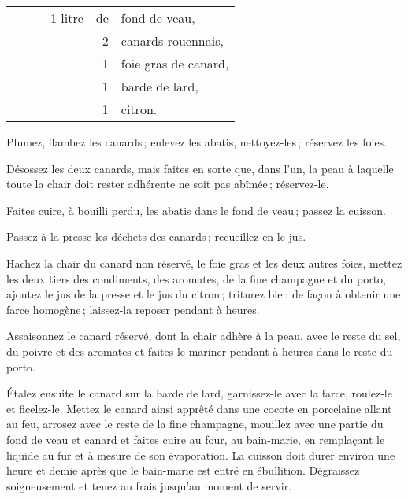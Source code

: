 \begin{longtable}{rrrrrp{18em}}
  & \hspace{2em} &     & 1 litre & de & fond de veau,                                                     \\
  & \hspace{2em} &     &         &  2 & canards rouennais,                                                \\
  & \hspace{2em} &     &         &  1 & foie gras de canard,                                              \\
  & \hspace{2em} &     &         &  1 & barde de lard,                                                    \\
  & \hspace{2em} &     &         &  1 & citron.                                                           \\
\end{longtable}
\normalsize

Plumez, flambez les canards ; enlevez les abatis, nettoyez-les ; réservez les
foies.

Désossez les deux canards, mais faites en sorte que, dans l'un, la peau
à laquelle toute la chair doit rester adhérente ne soit pas abîmée ;
réservez-le.

Faites cuire, à bouilli perdu, les abatis dans le fond de veau ; passez la
cuisson.

Passez à la presse les déchets des canards ; recueillez-en le jus.

Hachez la chair du canard non réservé, le foie gras et les deux autres foies,
mettez les deux tiers des condiments, des aromates, de la fine champagne et du
porto, ajoutez le jus de la presse et le jus du citron ; triturez bien de façon
à obtenir une farce homogène ; laissez-la reposer pendant {\mmm}
à {\mmm} heures.

Assaisonnez le canard réservé, dont la chair adhère à la peau, avec le reste du
sel, du poivre et des aromates et faites-le mariner pendant {\mmm}
à {\mmm} heures dans le reste du porto.

Étalez ensuite le canard sur la barde de lard, garnissez-le avec la farce,
roulez-le et ficelez-le. Mettez le canard ainsi apprêté dans une cocote en
porcelaine allant au feu, arrosez avec le reste de la fine champagne, mouillez
avec une partie du fond de veau et canard et faites cuire au four, au
bain-marie, en remplaçant le liquide au fur et à mesure de son évaporation. La
cuisson doit durer environ une heure et demie après que le bain-marie est entré
en ébullition. Dégraissez soigneusement et tenez au frais jusqu'au moment de
servir.

